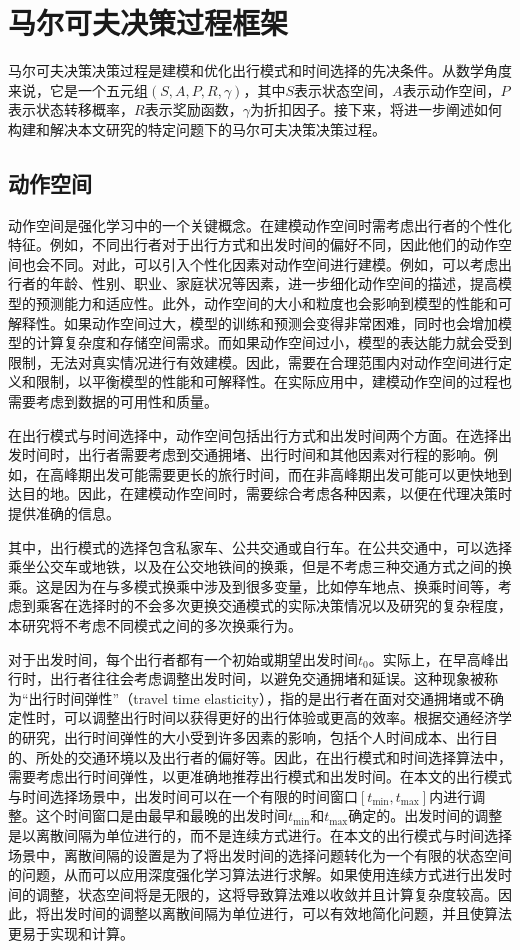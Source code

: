 \section{马尔可夫决策过程框架}
\label{sec:4_1}
马尔可夫决策决策过程是建模和优化出行模式和时间选择的先决条件。从数学角度来说，它是一个五元组$(S, A, P, R, \gamma)$，其中$S$表示状态空间，$A$表示动作空间，$P$表示状态转移概率，$R$表示奖励函数，$\gamma$为折扣因子。接下来，将进一步阐述如何构建和解决本文研究的特定问题下的马尔可夫决策决策过程。



\subsection{动作空间}

动作空间是强化学习中的一个关键概念。在建模动作空间时需考虑出行者的个性化特征。例如，不同出行者对于出行方式和出发时间的偏好不同，因此他们的动作空间也会不同。对此，可以引入个性化因素对动作空间进行建模。例如，可以考虑出行者的年龄、性别、职业、家庭状况等因素，进一步细化动作空间的描述，提高模型的预测能力和适应性。此外，动作空间的大小和粒度也会影响到模型的性能和可解释性。如果动作空间过大，模型的训练和预测会变得非常困难，同时也会增加模型的计算复杂度和存储空间需求。而如果动作空间过小，模型的表达能力就会受到限制，无法对真实情况进行有效建模。因此，需要在合理范围内对动作空间进行定义和限制，以平衡模型的性能和可解释性。在实际应用中，建模动作空间的过程也需要考虑到数据的可用性和质量。

在出行模式与时间选择中，动作空间包括出行方式和出发时间两个方面。在选择出发时间时，出行者需要考虑到交通拥堵、出行时间和其他因素对行程的影响。例如，在高峰期出发可能需要更长的旅行时间，而在非高峰期出发可能可以更快地到达目的地。因此，在建模动作空间时，需要综合考虑各种因素，以便在代理决策时提供准确的信息。

其中，出行模式的选择包含私家车、公共交通或自行车。在公共交通中，可以选择乘坐公交车或地铁，以及在公交地铁间的换乘，但是不考虑三种交通方式之间的换乘。这是因为在与多模式换乘中涉及到很多变量，比如停车地点、换乘时间等，考虑到乘客在选择时的不会多次更换交通模式的实际决策情况以及研究的复杂程度，本研究将不考虑不同模式之间的多次换乘行为。

对于出发时间，每个出行者都有一个初始或期望出发时间$t_0$。实际上，在早高峰出行时，出行者往往会考虑调整出发时间，以避免交通拥堵和延误。这种现象被称为“出行时间弹性”（travel time elasticity），指的是出行者在面对交通拥堵或不确定性时，可以调整出行时间以获得更好的出行体验或更高的效率。根据交通经济学的研究，出行时间弹性的大小受到许多因素的影响，包括个人时间成本、出行目的、所处的交通环境以及出行者的偏好等。因此，在出行模式和时间选择算法中，需要考虑出行时间弹性，以更准确地推荐出行模式和出发时间。在本文的出行模式与时间选择场景中，出发时间可以在一个有限的时间窗口$[t_{\min},t_{\max}]$内进行调整。这个时间窗口是由最早和最晚的出发时间$t_{\min}$和$t_{\max}$确定的。出发时间的调整是以离散间隔为单位进行的，而不是连续方式进行。在本文的出行模式与时间选择场景中，离散间隔的设置是为了将出发时间的选择问题转化为一个有限的状态空间的问题，从而可以应用深度强化学习算法进行求解。如果使用连续方式进行出发时间的调整，状态空间将是无限的，这将导致算法难以收敛并且计算复杂度较高。因此，将出发时间的调整以离散间隔为单位进行，可以有效地简化问题，并且使算法更易于实现和计算。


